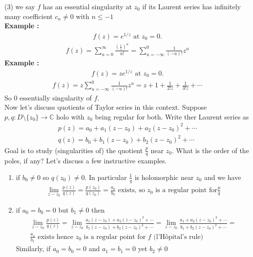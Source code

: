 (3) we say $f$ has an essential singularity at $z_0$ if its Laurent series has infinitely many coefficient $c_n \neq 0$ with $n \leq -1$ \\
\textbf{Example :}
\begin{align*}
    f(z) = e^{1/z} \text{ at } z_0 = 0.
\end{align*}
\begin{align*}
    f(z) = \sum_{u=0}^\infty \frac{(\frac{1}{z})^u}{u!} = \sum_{u = - \infty}^0\frac{1}{(-u)!}z^u
\end{align*}
\textbf{Example :}
\begin{align*}
    f(z) = ze^{1/z} \text{ at } z_0 = 0.
\end{align*}
\begin{align*}
    f(z) = z  \sum_{u = - \infty}^0\frac{1}{(-u)!}z^u = z+1 + \frac{1}{2!z} + \frac{1}{3!z} + \cdots 
\end{align*}
So $0$ essentially singularity of $f$. \\
Now let's discuss quotients of Taylor series in this context. Suppose $p,q: D \setminus\{z_0\} \rightarrow \mathbb{C}$ holo with $z_0$ being regular for both. Write ther Laurent series as 
\begin{align*}
    p(z) = a_0 + a_1(z-z_0) + a_2(z-z_0)^2 + \cdots \\
    q(z) = b_0 + b_1(z-z_0) + b_2(z-z_0)^2 + \cdots 
\end{align*}
Goal is to study (singularities of) the quotient $\frac{p}{q}$ near $z_0$. What is the order of the poles, if any? Let's discuss a few instructive examples. 
\begin{enumerate}
    \item if $b_0 \neq 0$ so $q(z_0) \neq 0$. In particular $\frac{1}{q}$ is holomorphic near $z_0$ and we have 
    \begin{align*}
        \lim_{z-z_0}\frac{p(z)}{q(z)} = \frac{p(z_0)}{q(z_0)} = \frac{a_0}{b_0} \text{ exists, so }z_0 \text{ is a regular point for} \frac{p}{q} 
    \end{align*}
    \item if $a_0 = b_0 = 0$ but $b_1 \neq 0$ then 
    \begin{align*}
        \lim_{z-z_0}\frac{p(z)}{q(z)} = \lim_{z-z_0} \frac{a_1(z-z_0) + a_2(z-z_0)^2 + \cdots }{b_1(z-z_0) + b_2(z-z_0)^2 + \cdots } = \lim_{z-z_0}\frac{a_1 + a_2(z-z_0)^2 + \cdots }{b_1 + b_2(z-z_0)^2 + \cdots } = \\
        \frac{a_1}{b_1} \text{ exists hence } z_0 \text{ is a regular point for } f \text{ (l'Hôpital's rule)}
    \end{align*}
    Similarly, if $a_0=b_0=0$ and $a_1=b_1=0$ yet $b_2 \neq 0$
\end{enumerate}
